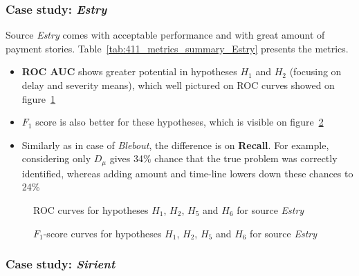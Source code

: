 \documentclass{article}
\begin{document}
\FloatBarrier

\subsubsection{Case study: \textit{Estry}}

Source \textit{Estry} comes with acceptable performance and with great amount of payment stories.
Table\ \ref{tab:411_metrics_summary_Estry} presents the metrics.
\begin{itemize}
    \item \textbf{ROC AUC} shows greater potential in hypotheses $H_1$ and $H_2$ (focusing on delay and severity means), which well pictured on ROC curves showed on figure\ \ref{fig:412_roc_curves_Estry}
    \item $F_1$ score is also better for these hypotheses, which is visible on figure\ \ref{fig:413_f1_curves_Estry}
    \item Similarly as in case of \textit{Blebout}, the difference is on \textbf{Recall}. For example, considering only $D_{\mu}$ gives 34\% chance that the true problem was correctly identified, whereas adding amount and time-line lowers down these chances to 24\%
\end{itemize}



\begin{figure}[htbp!]
    \begin{center}
        
    \caption{ROC curves for hypotheses $H_1$, $H_2$, $H_5$ and $H_6$ for source \textit{Estry}}
    \label{fig:412_roc_curves_Estry}
    \end{center}
\end{figure}

\begin{figure}[htbp!]
    \begin{center}
        
    \caption{$F_1$-score curves for hypotheses $H_1$, $H_2$, $H_5$ and $H_6$ for source \textit{Estry}}
    \label{fig:413_f1_curves_Estry}
    \end{center}
\end{figure}

\FloatBarrier

\subsubsection{Case study: \textit{Sirient}}
\end{document}
